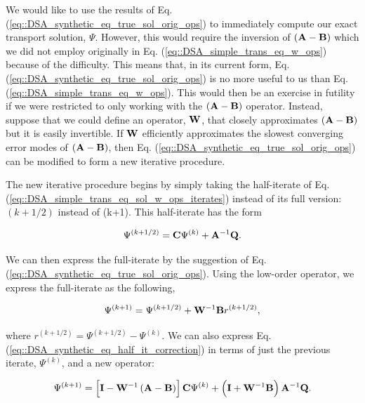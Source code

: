 We would like to use the results of Eq. (\ref{eq::DSA_synthetic_eq_true_sol_orig_ops}) to immediately compute our exact transport solution, $\Psi$. However, this would require the inversion of $\left(  {\bf A} - {\bf B}  \right)$ which we did not employ originally in Eq. (\ref{eq::DSA_simple_trans_eq_w_ops}) because of the difficulty. This means that, in its current form, Eq. (\ref{eq::DSA_synthetic_eq_true_sol_orig_ops}) is no more useful to us than Eq. (\ref{eq::DSA_simple_trans_eq_w_ops}). This would then be an exercise in futility if we were restricted to only working with the $\left(  {\bf A} - {\bf B}  \right)$ operator. Instead, suppose that we could define an operator, ${\bf W}$, that closely approximates $\left(  {\bf A} - {\bf B}  \right)$ but it is easily invertible. If ${\bf W}$ efficiently approximates the slowest converging error modes of $\left(  {\bf A} - {\bf B}  \right)$, then Eq. (\ref{eq::DSA_synthetic_eq_true_sol_orig_ops}) can be modified to form a new iterative procedure.

The new iterative procedure begins by simply taking the half-iterate of Eq. (\ref{eq::DSA_simple_trans_eq_sol_w_ops_iterates}) instead of its full version: ${(k+1/2)}$ instead of {(k+1)}. This half-iterate has the form

\begin{equation}
\label{eq::DSA_synthetic_eq_half_it}
\Psi^{(k+1/2)} = {\bf C} \Psi^{(k)} + {\bf A}^{-1} {\bf Q}.
\end{equation}

\noindent We can then express the full-iterate by the suggestion of Eq. (\ref{eq::DSA_synthetic_eq_true_sol_orig_ops}). Using the low-order operator, we express the full-iterate as the following,

\begin{equation}
\label{eq::DSA_synthetic_eq_half_it_correction}
\Psi^{(k+1)} =\Psi^{(k+1/2)} + {\bf W}^{-1} {\bf B}  r^{(k+1/2)},
\end{equation}

\noindent where $r^{(k+1/2)} = \Psi^{(k+1/2)} - \Psi^{(k)}$. We can also express Eq. (\ref{eq::DSA_synthetic_eq_half_it_correction}) in terms of just the previous iterate, $\Psi^{(k)}$, and a new operator:

\begin{equation}
\label{eq::DSA_synthetic_eq_new_algo}
\Psi^{(k+1)} = \left[  {\bf I} - {\bf W}^{-1} \left(  {\bf A} - {\bf B}  \right)  \right] {\bf C} \Psi^{(k)} + \left({\bf I} + {\bf W}^{-1} {\bf B} \right) {\bf A}^{-1} {\bf Q} .
\end{equation}


